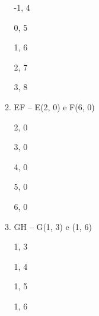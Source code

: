 \begin{enumerate}
\begin{enumerate}[label=\alph*.]
						 -1, 4
						 
						 0, 5
						  
						 1, 6
						  
						 2, 7
						  
						 3, 8
									
					\item EF – E(2, 0) e F(6, 0)
					
						2, 0
						
						3, 0
						
						4, 0
						
						5, 0
						
						6, 0
									
					\item   GH – G(1, 3) e (1, 6)
									
                      1, 3
                      
                      1, 4
                      
                      1, 5
                      
                      1, 6
									
				\end{enumerate}
	
	\end{enumerate}
	
\newpage